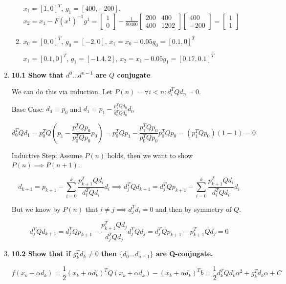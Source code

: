 \documentclass[10pt,a4paper]{article}
\begin{document}
\begin{enumerate}
\begin{enumerate}
        $x_1 = [1, 0]^T$, $g_1 = [400, -200]$, $x_2 = x_1 - F(x^1)^{-1} g^1  = \begin{bmatrix} 1\\ 0 \end{bmatrix} - \frac{1}{80400} \begin{bmatrix} 200 & 400 \\ 400 & 1202 \end{bmatrix} \begin{bmatrix} 400 \\ -200 \end{bmatrix} = \begin{bmatrix}1 \\1 \end{bmatrix}$
        \item $x_0 = [0, 0]^T$, $g_0 = [-2, 0]$, $x_1 = x_0 - 0.05 g_0 = [0.1, 0]^T$

        $x_1 = [0.1, 0]^T$, $g_1 = [-1.4, 2]$, $x_2 = x_1 - 0.05 g_1 = [0.17, 0.1]^T$

    \end{enumerate}

    \item \textbf{10.1 Show that $d^0 \dots d^{n-1}$ are $Q$ conjugate}
    
    We can do this via induction. Let $P(n) = \forall i < n : d_{i}^TQd_n = 0$.
   
    Base Case: $d_0 = p_0$ and $d_1 = p_1 - \frac{p_1^TQd_0}{d_0^TQd_0}d_0$

    $$d_0^TQd_1 = p_0^TQ(p_1 - \frac{p_1^TQp_0}{p_0^TQp_0}p_0) = p_0^TQp_1 - \frac{p_1^TQp_0}{p_0^TQp_0}p_0^TQp_0 = (p_1^TQp_0) (1-1) = 0$$

    Inductive Step: Assume $P(n)$ holds, then we want to show $P(n) \implies P(n+1)$.

    $$d_{k+1} = p_{k+1} - \sum_{i=0}^k \frac{p_{k+1}^TQd_i}{d_i^TQd_i}d_i \implies d_j^TQd_{k+1} = d_j^TQp_{k+1} - \sum_{i=0}^k \frac{p_{k+1}^TQd_i}{d_i^TQd_i}d_i$$

    But we know by $P(n)$ that $ i \neq j \implies d_j^Td_i = 0$ and then by symmetry of $Q$.

    $$d_j^TQd_{k+1} = d_j^TQp_{k+1} - \frac{p_{k+1}^TQd_j}{d_j^TQd_j}d_j^TQd_j = d_j^TQp_{k+1} - p_{k+1}^TQd_j = 0$$


    \item \textbf{10.2 Show that if $g_k^Td_k \neq 0$ then $\{ d_0 \ldots d_{n-1} \}$ are Q-conjugate.}
    
    $$f(x_k + \alpha d_k) = \frac{1}{2} (x_k + \alpha d_k)^T Q (x_k + \alpha d_k) - (x_k + \alpha d_k)^Tb= \frac{1}{2} d_k^TQd_k \alpha^2 + g_k^Td_k \alpha + C$$
    

\end{enumerate}
\end{document}
